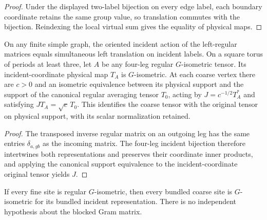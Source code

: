 \begin{proof}\leanok
    Under the displayed two-label bijection on every edge label,
    each boundary coordinate retains the same group value, so translation
    commutes with the bijection. Reindexing the local virtual sum gives the
    equality of physical maps.
\end{proof}

\begin{lemma}%
    \label{thm:peps_two_by_two_original_canonical}
    \leanok
    On any finite simple graph, the oriented incident action of the
    left-regular matrices equals simultaneous left translation on incident
    labels. On a square torus of periods at least three, let $A$ be any
    four-leg regular $G$-isometric tensor. Its incident-coordinate physical
    map $T_A$ is $G$-isometric. At each coarse vertex there are $c>0$ and an
    isometric equivalence between its physical support and the support of
    the canonical regular averaging tensor $T_0$, acting by
    $J=c^{-1/2}T_A^*$ and satisfying $JT_A=\sqrt c\,T_0$.
    This identifies the coarse tensor with the original tensor on physical
    support, with its scalar normalization retained.
\end{lemma}

\begin{proof}\leanok
    The transposed inverse regular matrix on an outgoing leg has the same
    entries $\delta_{a,gb}$ as the incoming matrix. The four-leg incident
    bijection therefore intertwines both representations and preserves
    their coordinate inner products, and applying the canonical support
    equivalence to the incident-coordinate original tensor yields $J$.
\end{proof}

\begin{lemma}%
    \label{thm:peps_two_by_two_bundled_isometry}
    \leanok
    If every fine site is regular $G$-isometric, then every bundled
    coarse site is $G$-isometric for its bundled incident representation.
    There is no independent hypothesis about the blocked Gram matrix.
\end{lemma}

